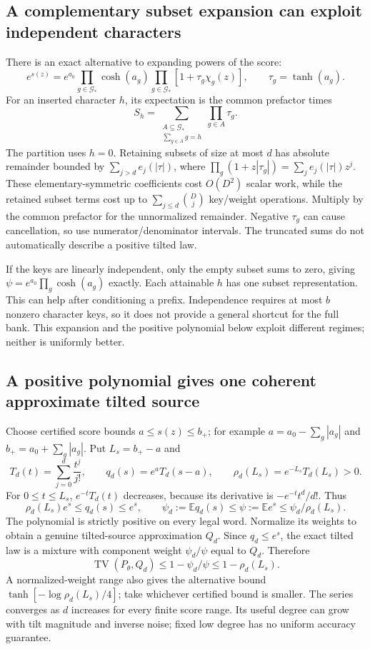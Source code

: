 \documentclass[10pt,a4paper]{article}
\newcommand{\E}{\mathbb E}
\newcommand{\TV}{\operatorname{TV}}
\begin{document}
\subsection{A complementary subset expansion can exploit independent characters}
There is an exact alternative to expanding powers of the score:
\[
 e^{s(z)}=e^{a_0}\prod_{g\in\mathcal G_*}\cosh(a_g)
                         \prod_{g\in\mathcal G_*}[1+\tau_g\chi_g(z)],
 \qquad \tau_g=\tanh(a_g).
\]
For an inserted character $h$, its expectation is the common prefactor times
\[
 S_h=\sum_{\substack{A\subseteq\mathcal G_*\\\sum_{g\in A}g=h}}\prod_{g\in A}\tau_g.
\]
The partition uses $h=0$. Retaining subsets of size at most $d$ has absolute remainder bounded by
$\sum_{j>d}e_j(|\tau|)$, where
$\prod_g(1+z|\tau_g|)=\sum_j e_j(|\tau|)z^j$.
These elementary-symmetric coefficients cost $O(D^2)$ scalar work, while the retained subset terms cost
up to $\sum_{j\leq d}\binom Dj$ key/weight operations. Multiply by the common prefactor for the
unnormalized remainder. Negative $\tau_g$ can cause cancellation, so use numerator/denominator intervals.
The truncated sums do not automatically describe a positive tilted law.

If the keys are linearly independent, only the empty subset sums to zero, giving
$\psi=e^{a_0}\prod_g\cosh(a_g)$ exactly. Each attainable $h$ has one subset representation.
This can help after conditioning a prefix. Independence requires at most $b$ nonzero character keys,
so it does not provide a general shortcut for the full bank.
This expansion and the positive polynomial below exploit different regimes; neither is uniformly better.

\subsection{A positive polynomial gives one coherent approximate tilted source}
Choose certified score bounds $a\leq s(z)\leq b_+$; for example
$a=a_0-\sum_g|a_g|$ and $b_+=a_0+\sum_g|a_g|$. Put $L_s=b_+-a$ and
\[
 T_d(t)=\sum_{j=0}^d\frac{t^j}{j!},\qquad
 q_d(s)=e^aT_d(s-a),\qquad
 \rho_d(L_s)=e^{-L_s}T_d(L_s)>0.
\]
For $0\leq t\leq L_s$, $e^{-t}T_d(t)$ decreases, because its derivative is
$-e^{-t}t^d/d!$. Thus
\begin{equation}
 \rho_d(L_s)e^s\leq q_d(s)\leq e^s,\qquad
 \psi_d:=\E q_d(s)\leq\psi:=\E e^s\leq\psi_d/\rho_d(L_s).
 \label{eq:polar-positive-series}
\end{equation}
The polynomial is strictly positive on every legal word. Normalize its weights to obtain a genuine
tilted-source approximation $Q_d$. Since $q_d\leq e^s$, the exact tilted law is a mixture with component
weight $\psi_d/\psi$ equal to $Q_d$. Therefore
\[
 \TV(P_\theta,Q_d)\leq1-\psi_d/\psi\leq1-\rho_d(L_s).
\]
A normalized-weight range also gives the alternative bound
$\tanh[-\log\rho_d(L_s)/4]$; take whichever certified bound is smaller.
The series converges as $d$ increases for every finite score range. Its useful degree can grow with
tilt magnitude and inverse noise; fixed low degree has no uniform accuracy guarantee.
\end{document}
